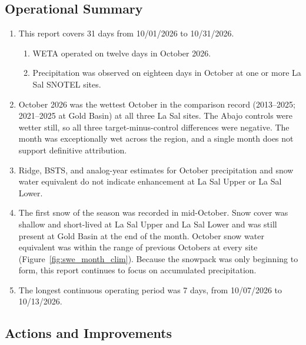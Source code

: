 \documentclass[11pt]{article}
\begin{document}
\subsection{Operational Summary}

\begin{enumerate}
  \item This report covers 31 days from 10/01/2026 to 10/31/2026.
  \begin{enumerate}[label=\alph*.]
    \item WETA operated on twelve days in October 2026.
    \item Precipitation was observed on eighteen days in October at one or more La Sal SNOTEL sites.
  \end{enumerate}
  \item October 2026 was the wettest October in the comparison record (2013--2025; 2021--2025
  at Gold Basin) at all three La Sal sites. The Abajo controls were wetter still, so all three
  target-minus-control differences were negative. The month was exceptionally wet across the
  region, and a single month does not support definitive attribution.
  \item Ridge, BSTS, and analog-year estimates for October precipitation and snow water
  equivalent do not indicate enhancement at La Sal Upper or La Sal Lower.
  \item The first snow of the season was recorded in mid-October. Snow cover was shallow and
  short-lived at La Sal Upper and La Sal Lower and was still present at Gold Basin at the end
  of the month. October snow water equivalent was within the range of previous Octobers at
  every site (Figure~\ref{fig:swe_month_clim}). Because the snowpack was only beginning to
  form, this report continues to focus on accumulated precipitation.
  \item The longest continuous operating period was 7 days, from 10/07/2026 to 10/13/2026.
\end{enumerate}

\subsection{Actions and Improvements}
\end{document}
